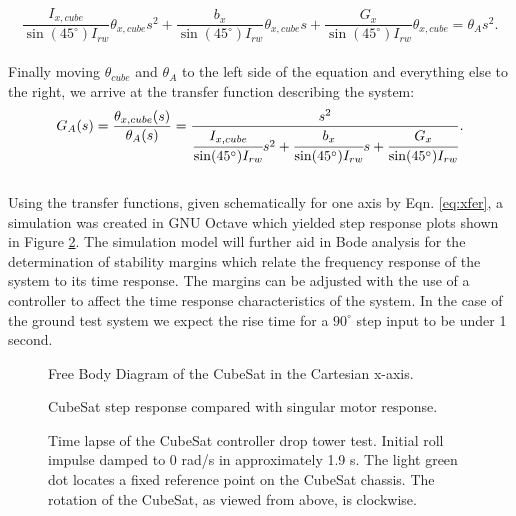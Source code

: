 \documentclass[]{aiaa-tc}%
\begin{document}
\[
\frac{I_{x,cube}}{\sin(45^{\circ}) I_{rw}} \theta_{x,cube} s^2 +
\frac{b_x}{\sin(45^{\circ}) I_{rw}} \theta_{x,cube} s +
\frac{G_x}{\sin(45^{\circ}) I_{rw}} \theta_{x,cube} = \theta_A s^2.
\]\\
	
Finally moving $\theta_{cube}$ and $\theta_A$ to the left side of the equation and everything else to the right, we arrive at the transfer function describing the system:\\

\begin{equation}
\label{eq:xfer}
G_A(s)=\frac{\theta_{x,cube}(s)}{\theta_A(s)}=\frac{s^2}{\cfrac{I_{x,cube}}{\sin(45^{\circ}) I_{rw}}s^2 + \cfrac{b_x}{\sin(45^{\circ}) I_{rw}}s + \cfrac{G_x}{\sin(45^{\circ}) I_{rw}}}.
\end{equation}\\
	
Using the transfer functions, given schematically for one axis by Eqn. \ref{eq:xfer}, a simulation was created in GNU Octave which yielded step response plots shown in Figure \ref{fig:simulation}. The simulation model will further aid in Bode analysis for the determination of stability margins which relate the frequency response of the system to its time response. The margins can be adjusted with the use of a controller to affect the time response characteristics of the system. In the case of the ground test system we expect the rise time for a $90^{\circ}$ step input to be under 1 second. 
\begin{figure}[h!]
  \centering
  
  \caption{Free Body Diagram of the CubeSat in the Cartesian x-axis.}
  \label{fig:FBD}
\end{figure}

\begin{figure}[h!]
  \centering
  {\footnotesize }
  \caption{CubeSat step response compared with singular motor response.}
  \label{fig:simulation}
\end{figure}

\begin{figure}[!ht]
 \centering
 {}
 \caption{Time lapse of the CubeSat controller drop tower test. Initial roll impulse damped to 0 rad/s in approximately 1.9 s. The light green dot locates a fixed reference point on the CubeSat chassis. The rotation of the CubeSat, as viewed from above, is clockwise.}
 \label{fig:lapse}
\end{figure}
\end{document}
